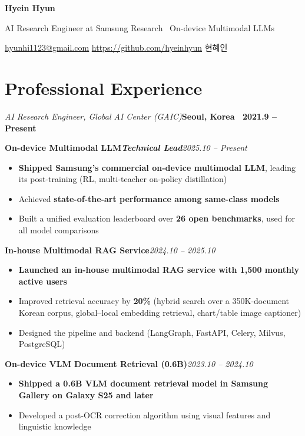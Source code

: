 \documentclass[10pt,a4paper]{article}
\newcommand{\sep}{\enspace\textbar\enspace}
\newcommand{\entry}[2]{\par\noindent#1\hfill#2\par}
\newcommand{\job}[3]{\par\vspace{3pt}%
  \entry{{\fontsize{11}{13}\selectfont\bfseries\scshape #1}%
         \enspace{\color{black!45}\textbar}\enspace\textit{#2}}%
        {\textbf{#3}}%
  \vspace{1pt}}
\newcommand{\project}[2]{\par\vspace{5pt}\entry{\textbf{#1}}{\textit{#2}}}
\newcommand{\lead}{\enspace{\color{black!45}\textbar}\enspace\textit{Technical Lead}}
\begin{document}
{\fontsize{24}{28}\selectfont\bfseries Hyein Hyun}\par\vspace{3pt}
AI Research Engineer at Samsung Research \textbar\ On-device Multimodal LLMs\par
\href{mailto:hyunhi1123@gmail.com}{\underline{hyunhi1123@gmail.com}}%
\sep\href{https://github.com/hyeinhyun}{https://github.com/hyeinhyun}%
\sep 현혜인\par

\section{Professional Experience}

\job{Samsung Research}{AI Research Engineer, Global AI Center (GAIC)}{Seoul, Korea \textbar\ 2021.9 -- Present}

\project{On-device Multimodal LLM\lead}{2025.10 -- Present}
\begin{itemize}
  \item \textbf{Shipped Samsung's commercial on-device multimodal LLM}, leading its post-training
        (RL, multi-teacher on-policy distillation)
  \item Achieved \textbf{state-of-the-art performance among same-class models}
  \item Built a unified evaluation leaderboard over \textbf{26 open benchmarks}, used for all model comparisons
\end{itemize}

\project{In-house Multimodal RAG Service}{2024.10 -- 2025.10}
\begin{itemize}
  \item \textbf{Launched an in-house multimodal RAG service with 1,500 monthly active users}
  \item Improved retrieval accuracy by \textbf{20\%} (hybrid search over a 350K-document Korean corpus,
        global--local embedding retrieval, chart/table image captioner)
  \item Designed the pipeline and backend (LangGraph, FastAPI, Celery, Milvus, PostgreSQL)
\end{itemize}

\project{On-device VLM Document Retrieval (0.6B)}{2023.10 -- 2024.10}
\begin{itemize}
  \item \textbf{Shipped a 0.6B VLM document retrieval model in Samsung Gallery on Galaxy S25 and later}
  \item Developed a post-OCR correction algorithm using visual features and linguistic knowledge
\end{itemize}
\end{document}
